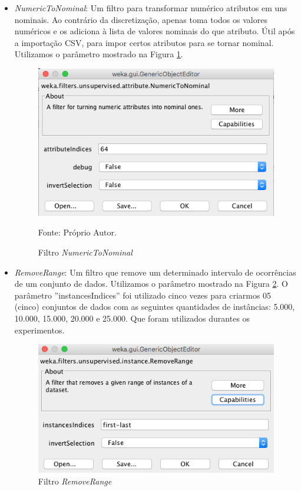 \documentclass[
	12pt,				%
	openright,			%
	oneside,	
	a4paper,				%
	english,				%
	brazil				%
]{abntex2/abntex2} %
\begin{document}
\begin{itemize}
			\item \textit{NumericToNominal}: Um filtro para transformar numérico atributos em uns nominais. Ao contrário da discretização, apenas toma todos os valores numéricos e os adiciona à lista de valores nominais do que atributo. Útil após a importação CSV, para impor certos atributos para se tornar nominal. Utilizamos o parâmetro mostrado na Figura \ref{figfiltroNumericToNominal}.
			\begin{figure}[!h]
				\caption{\label{figfiltroNumericToNominal} \fontsize{10}{\baselineskip} \selectfont Filtro \textit{NumericToNominal}}
				\begin{center}
					\includegraphics[scale=0.45]{img/filtroNumericToNominal.png}
				\end{center}
				\hspace{4cm} {\fontsize{10}{\baselineskip} \selectfont Fonte: Próprio Autor.}
			\end{figure}
			\newpage
			\item \textit{RemoveRange}: Um filtro que remove um determinado intervalo de ocorrências de um conjunto de dados. Utilizamos o parâmetro mostrado na Figura \ref{figfiltroRemoveRange}. O parâmetro ''instancesIndices''  foi utilizado cinco vezes para criarmos 05 (cinco) conjuntos de dados com as seguintes quantidades de instâncias: 5.000, 10.000, 15.000, 20.000 e 25.000. Que foram utilizados durantes os experimentos.
			\begin{figure}[!h]
					\caption{\label{figfiltroRemoveRange} \fontsize{10}{\baselineskip} \selectfont Filtro \textit{RemoveRange}}
				\begin{center}
					\includegraphics[scale=0.45]{img/filtroRemoveRange.png}

\end{center}
\end{figure}
\end{itemize}
\end{document}
